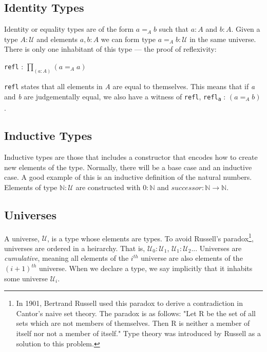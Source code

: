 \documentclass[12pt]{report}
\begin{document}
\subsection{Identity Types}
Identity or equality types are of the form $a =_A b$ such that $a : A$ and $b : A$. Given a type $A : \mathcal{U}$ and elements $a,b : A$ we can form type $a =_A b : \mathcal{U}$ in the same universe. There is only one inhabitant of this type --- the proof of reflexivity:
\begin{center}
 \texttt{refl} : $\prod_{(a:A)}^{} (a =_A a) $
\end{center}
\texttt{refl} states that all elements in \textit{A} are equal to themselves. This means that if \textit{a} and \textit{b} are judgementally equal, we also have a witness of \texttt{refl},  \texttt{refl\textsubscript{a}} : $(a =_A b)$.
\subsection{Inductive Types}
Inductive types are those that includes a constructor that encodes how to create new elements of the type. Normally, there will be a base case and an inductive case. A good example of this is an inductive definition of the natural numbers. Elements of type $\mathbb{N} : \mathcal{U} $ are constructed with $0 : \mathbb{N} $ and $successor : \mathbb{N} \rightarrow \mathbb{N}$.
\subsection{Universes}
A universe, $\mathcal{U}$, is a type whose elements are types. To avoid Russell's paradox\footnote{
In 1901, Bertrand Russell used this paradox to derive a contradiction in Cantor's naive set theory. The paradox is as follows: "Let R be the set of all sets which are not members of themselves. Then R is neither a member of itself nor not a member of itself."\cite{rp} Type theory was introduced by Russell as a solution to this problem.
}, universes are ordered in a heirarchy. That is, $\mathcal{U}_0 : \mathcal{U}_1$, $ \mathcal{U}_1 : \mathcal{U}_2$... Universes are \textit{cumulative}, meaning all elements of the $i^{th}$ universe are also elements of the $(i+1)^{th}$ universe. When we declare a type, we say implicitly that it inhabits some universe $\mathcal{U}_i$.
\end{document}
